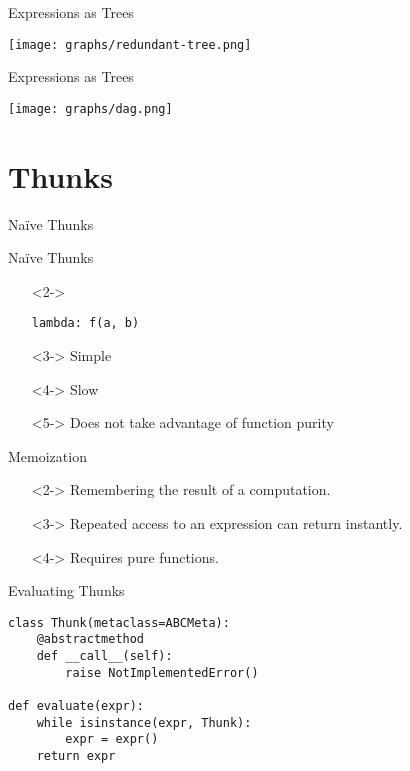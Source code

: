 \documentclass{beamer}
\begin{document}
\begin{frame}{Expressions as Trees}
  \begin{center}
    \texttt{[image: graphs/redundant-tree.png]}
  \end{center}
\end{frame}

\begin{frame}{Expressions as Trees}
  \begin{center}
    \texttt{[image: graphs/dag.png]}
  \end{center}
\end{frame}

\section{Thunks}

\begin{frame}[fragile]{Na\"ive Thunks}
  \begin{block}{Na\"ive Thunks}
    \begin{itemize}
    \item[]<2-> \begin{verbatim}
lambda: f(a, b)
      \end{verbatim}
    \item[]<3-> Simple
    \item[]<4-> Slow
    \item[]<5-> Does not take advantage of function purity
    \end{itemize}
  \end{block}
\end{frame}

\begin{frame}{Memoization}
  \begin{definition}[Memoize]
    \begin{itemize}
    \item[]<2-> Remembering the result of a computation.
    \item[]<3-> Repeated access to an expression can return instantly.
    \item[]<4-> Requires pure functions.
    \end{itemize}
  \end{definition}
\end{frame}

\begin{frame}[fragile]{Evaluating Thunks}
  \begin{verbatim}
class Thunk(metaclass=ABCMeta):
    @abstractmethod
    def __call__(self):
        raise NotImplementedError()

def evaluate(expr):
    while isinstance(expr, Thunk):
        expr = expr()
    return expr
  \end{verbatim}
\end{frame}
\end{document}

